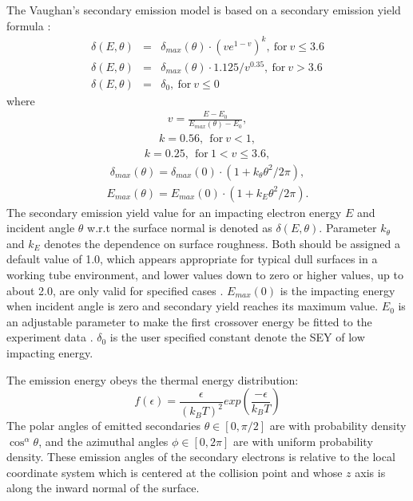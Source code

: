 The Vaughan's secondary emission model is based on a secondary emission yield formula \cite{Vaughan, VaughanRv}:
\begin{subequations}
\label{allequations}
\begin{eqnarray}
    \delta(E,\theta)&=&\delta_{max}(\theta)\cdot (v e^{1-v})^k,\ \text{for}\ v \le 3.6 \label{eq:VaughanA}
\\
\delta(E,\theta)&=&\delta_{max}(\theta)\cdot 1.125/v^{0.35},\ \text{for}\ v > 3.6 \label{eq:VaughanB}
\\
\delta(E,\theta)&=&\delta_0,\ \text{for}\ v \le 0 \label{eq:VaughanC}
\end{eqnarray}
\end{subequations}
where
\begin{eqnarray*}
v=\frac{\displaystyle E-E_0}{\displaystyle E_{max}(\theta)-E_0},
\end{eqnarray*}
\begin{eqnarray*}
k=0.56,\ \ \text{for}\ v<1,
\end{eqnarray*}
\begin{eqnarray*}
k=0.25,\ \ \text{for}\ 1<v\le{3.6},
\end{eqnarray*}
\begin{eqnarray*}
\delta_{max}(\theta)=\delta_{max}(0)\cdot (1+k_{\theta}\theta^2/2\pi),
\end{eqnarray*}
\begin{eqnarray*}
E_{max}(\theta)=E_{max}(0)\cdot (1+k_E\theta^2/2\pi).
\end{eqnarray*}
The secondary emission yield value for an impacting electron energy $E$ and incident angle $\theta$ w.r.t the surface normal is denoted as $\delta(E,\theta)$. Parameter $k_{\theta}$ and $k_E$ denotes the dependence on surface roughness. Both
should be assigned a default value of 1.0, which appears appropriate for typical dull surfaces in a working tube environment, and lower values down to zero or higher values, up to about 2.0, are only valid for specified cases \cite{Vaughan}. $E_{max}(0)$ is the impacting energy when incident angle is zero and secondary yield reaches its maximum value. $E_0$ is an adjustable parameter to make the first crossover energy be fitted to the experiment data \cite{FS}. $\delta_0$ is the user specified constant denote the SEY of low impacting energy.

The emission energy obeys the thermal energy distribution:
\begin{equation}
f(\epsilon) = \frac{\epsilon}{(k_BT)^2}exp\left(\frac{-\epsilon}{k_BT}\right) \label{eq:emienergy}
\end{equation}
The polar angles of emitted secondaries $\theta \in [0, \pi/2]$ are with probability density $\cos^{\alpha}\theta$, and the azimuthal angles $\phi \in [0, 2\pi]$ are with uniform probability density. These emission angles of the secondary electrons is relative to the local coordinate system which is centered at the collision point and whose $z$ axis is along the inward normal of the surface.

